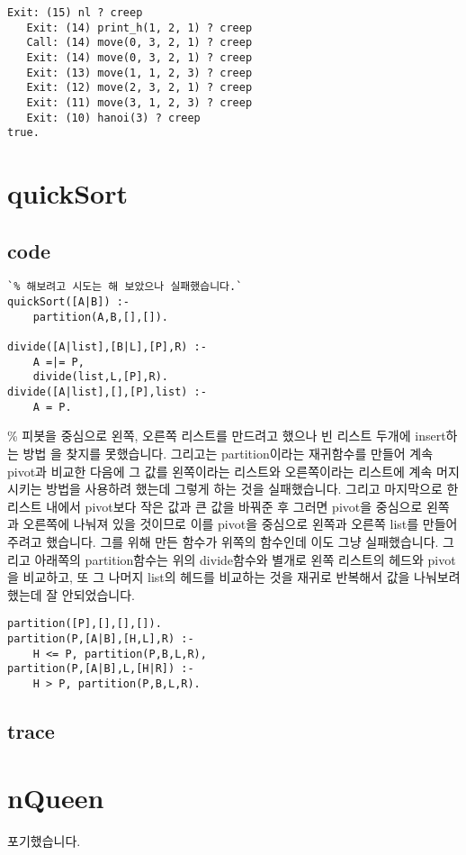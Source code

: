 \documentclass{article}
\begin{document}
\begin{lstlisting}[escapeinside=``]
   Exit: (15) nl ? creep
   Exit: (14) print_h(1, 2, 1) ? creep
   Call: (14) move(0, 3, 2, 1) ? creep
   Exit: (14) move(0, 3, 2, 1) ? creep
   Exit: (13) move(1, 1, 2, 3) ? creep
   Exit: (12) move(2, 3, 2, 1) ? creep
   Exit: (11) move(3, 1, 2, 3) ? creep
   Exit: (10) hanoi(3) ? creep
true.

\end{lstlisting}
\section{quickSort}

\subsection{code}
\begin{lstlisting}[escapeinside=``]
`% 해보려고 시도는 해 보았으나 실패했습니다.`
quickSort([A|B]) :- 
	partition(A,B,[],[]).

divide([A|list],[B|L],[P],R) :- 
	A =|= P,    
	divide(list,L,[P],R).
divide([A|list],[],[P],list) :-
	A = P.
\end{lstlisting}

\% 피봇을 중심으로 왼쪽, 오른쪽 리스트를 만드려고 했으나 빈 리스트 두개에 insert하는 방법
을 찾지를 못했습니다. 그리고는 partition이라는 재귀함수를 만들어 계속 pivot과 비교한 다음에
그 값를 왼쪽이라는 리스트와 오른쪽이라는 리스트에 계속 머지시키는 방법을 사용하려 했는데
그렇게 하는 것을 실패했습니다. 그리고 마지막으로 한 리스트 내에서 pivot보다
작은 값과 큰 값을 바꿔준 후 그러면 pivot을 중심으로 왼쪽과 오른쪽에 나눠져 있을 것이므로
이를 pivot을 중심으로 왼쪽과 오른쪽 list를 만들어주려고 했습니다. 그를 위해 만든 함수가 위쪽의 함수인데 이도 그냥 실패했습니다. 그리고 아래쪽의 partition함수는 위의 divide함수와 별개로
왼쪽 리스트의 헤드와 pivot을 비교하고, 또 그 나머지 list의 헤드를 비교하는 것을 재귀로
반복해서 값을 나눠보려했는데 잘 안되었습니다.

\begin{lstlisting}[escapeinside=``]
partition([P],[],[],[]). 
partition(P,[A|B],[H,L],R) :-
	H <= P, partition(P,B,L,R),
partition(P,[A|B],L,[H|R]) :-
	H > P, partition(P,B,L,R).
\end{lstlisting}
\subsection{trace}

\section{nQueen}
포기했습니다.
\end{document}
